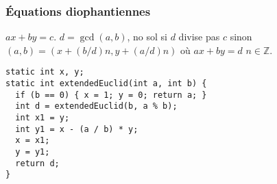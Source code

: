 \subsubsection{Équations diophantiennes}
$ax + by = c$. $d = \gcd(a,b)$, no sol si $d$ divise pas $c$ sinon $(a,b) = (x + (b/d)n, y + (a/d)n)$ où $ax + by = d$ $n \in \mathbb{Z}$.
\begin{lstlisting}
static int x, y;
static int extendedEuclid(int a, int b) {
  if (b == 0) { x = 1; y = 0; return a; }
  int d = extendedEuclid(b, a % b);
  int x1 = y;
  int y1 = x - (a / b) * y;
  x = x1;
  y = y1;
  return d;
}
\end{lstlisting}
